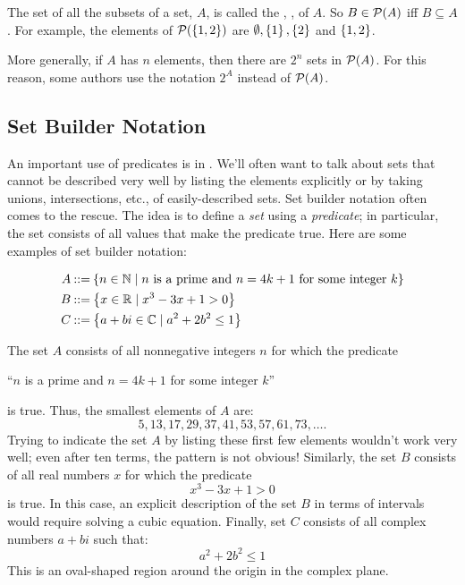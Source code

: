 The set of all the subsets of a set, $A$, is called the , , of $A$.  So $B \in \mathcal{P}(A)$ iff $B
\subseteq A$.  For example, the elements of $\mathcal{P}( \left\{1, 2\right\})$ are
$\emptyset, \left\{1\right\}, \left\{2\right\}$ and $\left\{1, 2\right\}$.

More generally, if $A$ has $n$ elements, then there are $2^n$ sets in
$\mathcal{P}(A)$.  For this reason, some authors use the notation $2^A$ instead
of $\mathcal{P}(A)$.

\subsection{Set Builder Notation}

An important use of predicates is in .  We'll
often want to talk about sets that cannot be described very well by
listing the elements explicitly or by taking unions, intersections,
etc., of easily-described sets.  Set builder notation often comes to the
rescue.  The idea is to define a \textit{set} using a \textit{predicate};
in particular, the set consists of all values that make the predicate
true.  Here are some examples of set builder notation:

\begin{align*}
A & \mathbin{::=} \left\{n \in \mathbb{N} \mid \text{$n$ is a prime and $n =
    4k+1$ for some integer $k$}\right\} \\
B & \mathbin{::=} \left\{x \in \mathbb{R} \mid x^3 - 3 x + 1 > 0\right\} \\
C & \mathbin{::=} \left\{a + b i \in \mathbb{C} \mid a^2 + 2 b^2 \leq 1\right\}
\end{align*}

The set $A$ consists of all nonnegative integers $n$ for which the
predicate
\begin{center}
``$n$ is a prime and $n = 4k+1$ for some integer $k$''
\end{center}
is true.  Thus, the smallest elements of $A$ are:
\[
5, 13, 17, 29, 37, 41, 53, 57, 61, 73, \ldots.
\]
Trying to indicate the set $A$ by listing these first few elements
wouldn't work very well; even after ten terms, the pattern is not
obvious!  Similarly, the set $B$ consists of all real numbers $x$ for
which the predicate
\[
x^3 - 3x + 1 > 0
\]
is true.  In this case, an explicit description of the set $B$ in
terms of intervals would require solving a cubic equation.  Finally,
set $C$ consists of all complex numbers $a + b i$ such that:
\[
a^2 + 2 b^2 \leq 1
\]
This is an oval-shaped region around the origin in the complex plane.

